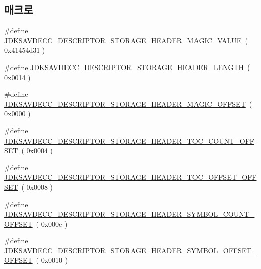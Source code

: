 \subsection*{매크로}
\begin{DoxyCompactItemize}
\item 
\#define \hyperlink{group__descriptor__storage__header_ga8a1885a60309a8834fb5d3505d63c400}{J\+D\+K\+S\+A\+V\+D\+E\+C\+C\+\_\+\+D\+E\+S\+C\+R\+I\+P\+T\+O\+R\+\_\+\+S\+T\+O\+R\+A\+G\+E\+\_\+\+H\+E\+A\+D\+E\+R\+\_\+\+M\+A\+G\+I\+C\+\_\+\+V\+A\+L\+UE}~( 0x41454d31 )
\item 
\#define \hyperlink{group__descriptor__storage__header_ga40ba715ff2f7643324bcd41822d75325}{J\+D\+K\+S\+A\+V\+D\+E\+C\+C\+\_\+\+D\+E\+S\+C\+R\+I\+P\+T\+O\+R\+\_\+\+S\+T\+O\+R\+A\+G\+E\+\_\+\+H\+E\+A\+D\+E\+R\+\_\+\+L\+E\+N\+G\+TH}~( 0x0014 )
\item 
\#define \hyperlink{group__descriptor__storage__header_ga99b64877253801c44997944b1c951f29}{J\+D\+K\+S\+A\+V\+D\+E\+C\+C\+\_\+\+D\+E\+S\+C\+R\+I\+P\+T\+O\+R\+\_\+\+S\+T\+O\+R\+A\+G\+E\+\_\+\+H\+E\+A\+D\+E\+R\+\_\+\+M\+A\+G\+I\+C\+\_\+\+O\+F\+F\+S\+ET}~( 0x0000 )
\item 
\#define \hyperlink{group__descriptor__storage__header_gaffb871a86e925cd3423153984e3fe2b8}{J\+D\+K\+S\+A\+V\+D\+E\+C\+C\+\_\+\+D\+E\+S\+C\+R\+I\+P\+T\+O\+R\+\_\+\+S\+T\+O\+R\+A\+G\+E\+\_\+\+H\+E\+A\+D\+E\+R\+\_\+\+T\+O\+C\+\_\+\+C\+O\+U\+N\+T\+\_\+\+O\+F\+F\+S\+ET}~( 0x0004 )
\item 
\#define \hyperlink{group__descriptor__storage__header_gaf5771f5dc02e8b63d9152c2421859775}{J\+D\+K\+S\+A\+V\+D\+E\+C\+C\+\_\+\+D\+E\+S\+C\+R\+I\+P\+T\+O\+R\+\_\+\+S\+T\+O\+R\+A\+G\+E\+\_\+\+H\+E\+A\+D\+E\+R\+\_\+\+T\+O\+C\+\_\+\+O\+F\+F\+S\+E\+T\+\_\+\+O\+F\+F\+S\+ET}~( 0x0008 )
\item 
\#define \hyperlink{group__descriptor__storage__header_ga8f599a40045785cffa37c361f8653e54}{J\+D\+K\+S\+A\+V\+D\+E\+C\+C\+\_\+\+D\+E\+S\+C\+R\+I\+P\+T\+O\+R\+\_\+\+S\+T\+O\+R\+A\+G\+E\+\_\+\+H\+E\+A\+D\+E\+R\+\_\+\+S\+Y\+M\+B\+O\+L\+\_\+\+C\+O\+U\+N\+T\+\_\+\+O\+F\+F\+S\+ET}~( 0x000c )
\item 
\#define \hyperlink{group__descriptor__storage__header_gabc3e6fbd3eea04b517b3bca6256ff67f}{J\+D\+K\+S\+A\+V\+D\+E\+C\+C\+\_\+\+D\+E\+S\+C\+R\+I\+P\+T\+O\+R\+\_\+\+S\+T\+O\+R\+A\+G\+E\+\_\+\+H\+E\+A\+D\+E\+R\+\_\+\+S\+Y\+M\+B\+O\+L\+\_\+\+O\+F\+F\+S\+E\+T\+\_\+\+O\+F\+F\+S\+ET}~( 0x0010 )
\end{DoxyCompactItemize}
